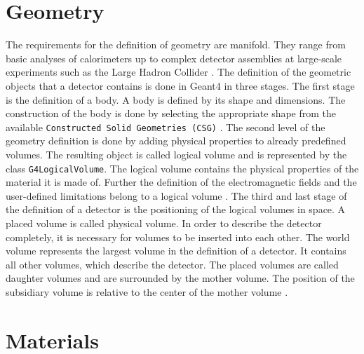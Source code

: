 \documentclass[12pt, a4paper]{thesis}
\begin{document}
\clearpage
\section{Geometry}
\label{sec:org8d2fc6f}

The requirements for the definition of geometry are manifold. They
range from basic analyses of calorimeters up to complex detector
assemblies at large-scale experiments such as the Large Hadron
Collider \cite{geant4_geom}. The definition of the geometric objects
that a detector contains is done in Geant4 in three stages.  The first
stage is the definition of a body. A body is defined by its shape and
dimensions. The construction of the body is done by selecting the
appropriate shape from the available \texttt{Constructed Solid
  Geometries (CSG)} \cite{geant4_geom}. The second level of the
geometry definition is done by adding physical properties to already
predefined volumes. The resulting object is called logical volume and
is represented by the class \texttt{G4LogicalVolume}. The logical
volume contains the physical properties of the material it is made
of. Further the definition of the electromagnetic fields and the
user-defined limitations belong to a logical volume
\cite{geant4-doc}. The third and last stage of the definition of a
detector is the positioning of the logical volumes in space. A placed
volume is called physical volume. In order to describe the detector
completely, it is necessary for volumes to be inserted into each
other.  The world volume represents the largest volume in the
definition of a detector. It contains all other volumes, which
describe the detector. The placed volumes are called daughter volumes
and are surrounded by the mother volume.  The position of the
subsidiary volume is relative to the center of the mother volume
\cite{geant4-doc}.

\clearpage
\section{Materials}
\label{sec:org11f3d27}
\end{document}
